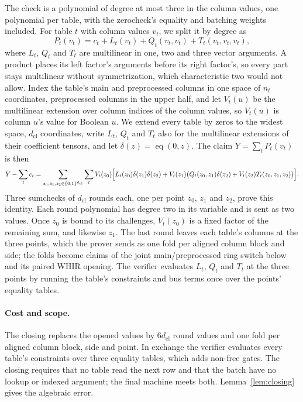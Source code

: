 \documentclass[11pt]{article}
\begin{document}
The check is a polynomial of degree at most three in the column values, one
polynomial per table, with the zerocheck's equality and batching weights
included. For table $t$ with column values $v_t$, we split it by degree as
\[
  P_t(v_t)=c_t+L_t(v_t)+Q_t(v_t,v_t)+T_t(v_t,v_t,v_t),
\]
where $L_t$, $Q_t$ and $T_t$ are multilinear in one, two and three vector
arguments. A product places its left factor's arguments before its right
factor's, so every part stays multilinear without symmetrization, which
characteristic two would not allow. Index the table's main and preprocessed
columns in one space of $n_t$ coordinates, preprocessed columns in the upper
half, and let $V_t(u)$ be the multilinear extension over column indices of
the column values, so $V_t(u)$ is column $u$'s value for Boolean $u$. We
extend every table by zeros to the widest space, $d_{\mathrm{cl}}$ coordinates, write
$L_t$, $Q_t$ and $T_t$ also for the multilinear extensions of their
coefficient tensors, and let $\delta(z)=\operatorname{eq}(0,z)$. The claim
$Y=\sum_tP_t(v_t)$ is then
\[
  Y-\sum_tc_t=\sum_{z_0,z_1,z_2\in\{0,1\}^{d_{\mathrm{cl}}}}\sum_tV_t(z_0)\Bigl[L_t(z_0)\delta(z_1)\delta(z_2)
  +V_t(z_1)\bigl(Q_t(z_0,z_1)\delta(z_2)+V_t(z_2)T_t(z_0,z_1,z_2)\bigr)\Bigr].
\]
Three sumchecks of $d_{\mathrm{cl}}$ rounds each, one per point $z_0$, $z_1$ and $z_2$,
prove this identity. Each round polynomial has degree two in its variable
and is sent as two values. Once $z_0$ is bound to its challenges,
$V_t(z_0)$ is a fixed factor of the remaining sum, and likewise $z_1$. The
last round leaves each table's columns at the three points, which the prover
sends as one fold per aligned column block and side; the folds become claims of the joint main/preprocessed ring switch below and its paired WHIR opening. The verifier evaluates
$L_t$, $Q_t$ and $T_t$ at the three points by running the table's constraints
and bus terms once over the points' equality tables.

\paragraph{Cost and scope.} The closing replaces the opened values by $6d_{\mathrm{cl}}$ round values and one fold per aligned column block, side and point. In
exchange the verifier evaluates every table's constraints over three equality
tables, which adds non-free gates. The closing requires that no table read the next row and that
the batch have no lookup or indexed argument; the final machine meets both.
Lemma~\ref{lem:closing} gives the algebraic error.
\end{document}
